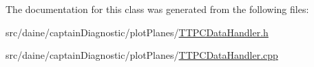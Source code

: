 The documentation for this class was generated from the following files\+:\begin{DoxyCompactItemize}
\item 
src/daine/captain\+Diagnostic/plot\+Planes/\hyperlink{_t_t_p_c_data_handler_8h}{T\+T\+P\+C\+Data\+Handler.\+h}\item 
src/daine/captain\+Diagnostic/plot\+Planes/\hyperlink{_t_t_p_c_data_handler_8cpp}{T\+T\+P\+C\+Data\+Handler.\+cpp}\end{DoxyCompactItemize}
